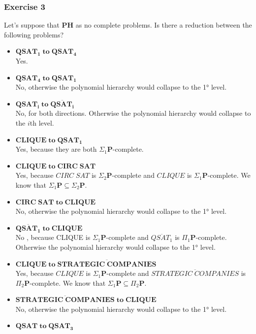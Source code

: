 \subsubsection{Exercise 3}
Let's suppose that \textbf{PH} as no complete problems. Is there a reduction between the following problems?
\begin{itemize}
    \item $\mathbf{QSAT_1 \; to \; QSAT_4}$\\
    Yes.
    \item $\mathbf{QSAT_4 \; to \; QSAT_1}$\\
    No, otherwise the polynomial hierarchy would collapse to the 1° level. 
    \item $\mathbf{QSAT_i \; to \; \overline{QSAT_i}}$\\
    No, for both directions. Otherwise the polynomial hierarchy would collapse to the $i$th level.
    \item $\mathbf{CLIQUE \; to \; QSAT_1}$\\
    Yes, because they are both $\Sigma_1\mathbf{P}$-complete. 
    \item $\mathbf{CLIQUE \; to \; CIRC \; SAT}$\\
    Yes, because $CIRC \; SAT$ is $\Sigma_2\mathbf{P}$-complete and $CLIQUE$ is $\Sigma_1\mathbf{P}$-complete. We know that $\Sigma_1\mathbf{P}\subseteq\Sigma_2\mathbf{P}$.
    \item $\mathbf{ CIRC \; SAT\; to \;CLIQUE }$\\
    No, otherwise the polynomial hierarchy would collapse to the 1° level.
    \item $\mathbf{ \overline{QSAT_1}\; to \; CLIQUE}$\\
    No , because CLIQUE is $\Sigma_1\mathbf{P}$-complete and $\overline{QSAT_1}$ is $\Pi_1\mathbf{P}$-complete. Otherwise the polynomial hierarchy would collapse to the 1° level.
    \item $\mathbf{CLIQUE \; to \; \overline{STRATEGIC \; COMPANIES}}$\\
    Yes, because $CLIQUE$ is $\Sigma_1\mathbf{P}$-complete and $\overline{STRATEGIC \; COMPANIES}$ is $\Pi_2\mathbf{P}$-complete. We know that $\Sigma_1\mathbf{P}\subseteq\Pi_2\mathbf{P}$.
    \item $\mathbf{\overline{STRATEGIC \; COMPANIES} \; to \;CLIQUE }$\\
    No, otherwise the polynomial hierarchy would collapse to the 1° level.
    \item $\mathbf{QSAT \; to \; QSAT_3}$\\

\end{itemize}
